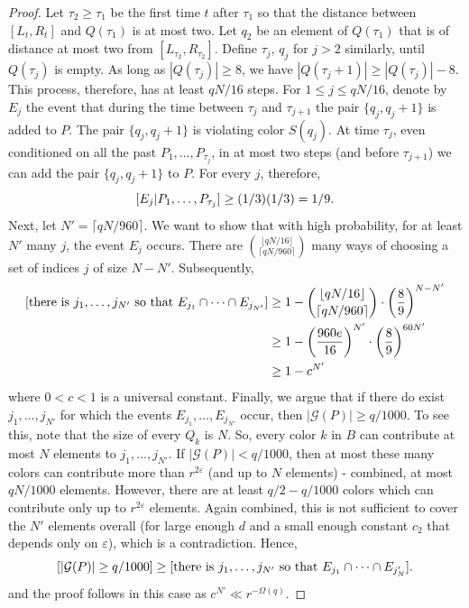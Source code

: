 \documentclass[10pt,a4paper]{article}
\theoremstyle{definition}%
\theoremstyle{plain}
\let\Pr\relax
\DeclareMathOperator*{\Pr}{\mathbb{P}}
\newcommand{\eps}{\varepsilon}
\renewcommand{\epsilon}{\eps}
\newcommand{\calG}{\mathcal{G}}
\begin{document}
\begin{proof}
Let $\tau_2 \geq \tau_1$ be the first time $t$ after $\tau_1$ so that the distance between $[L_t
, R_t
]$ and $Q(\tau_1)$ is at most
two. Let $q_2$ be an element of $Q(\tau_1)$ that is of distance at most two from $[L_{\tau_2}
, R_{\tau_2}
]$.
Define $\tau_j$, $q_j$ for $j > 2$ similarly, until $Q(\tau_j )$ is empty. As long as $|Q(\tau_j )| \geq 8$, we have $|Q(\tau_j+1)| \geq
|Q(\tau_j )| - 8$. This process, therefore, has at least $qN/16$ steps.
For $1 \leq j \leq qN/16$, denote by $E_j$ the event that during the time between $\tau_j$ and $\tau_{j+1}$ the pair
$\{q_j , q_j + 1\}$ is added to $P$. The pair $\{q_j , q_j + 1\}$ is violating color $S(q_j)$. At time $\tau_j$, even conditioned
on all the past $P_1, \ldots , P_{\tau_j}$, in at most two steps (and before $\tau_{j+1}$) we can add the pair $\{q_j , q_j + 1\}$
to $P$. For every $j$, therefore,
\[
\Pr[E_j |P_1,\ldots , P_{\tau_j}] \geq (1/3)(1/3) = 1/9.
\]
Next, let $N' = \lceil qN/960\rceil$. We want to show that with high probability,  for at least $N'$ many $j$, the event $E_j$ occurs. There are $\binom{\lfloor qN/16\rfloor}{\lceil qN/960 \rceil}$ many ways of choosing a set of indices $j$ of size $N-N'$. Subsequently,
\begin{align*}
\Pr[\text{there is $j_1,\ldots , j_{N'}$ so that $E_{j_1}\cap \cdots \cap E_{j_{N'}}$}] &\geq  1 - \binom{\lfloor qN/16\rfloor}{\lceil qN/960 \rceil}\cdot \left(\frac{8}{9}\right)^{N-N'}\\
&\geq 1 - \left(\frac{960e}{16}\right)^{N'}\cdot \left(\frac{8}{9}\right)^{60N'}\\
&\geq 1 - c^{N'}
\end{align*}
where $0< c < 1$ is a universal constant. Finally, we argue that if there do exist $j_1,\ldots , j_{N'}$ for which the events $E_{j_1},\ldots, E_{j_{N'}}$ occur, then $|\calG(P)|\geq q/1000$. To see this, note that the size of every $Q_k$ is $N$. So, every color $k$ in $B$ can contribute at most $N$ elements to
$j_1, \ldots , j_{N'}$. If $|\calG(P)|<q/1000$, then at most these many colors can contribute more than $r^{2\eps}$ (and up to $N$ elements) - combined, at most $qN/1000$ elements. However, there are at least $q/2 - q/1000$ colors which can contribute only up to $r^{2\eps}$ elements. Again combined, this is not sufficient to cover the $N'$ elements overall (for large enough $d$ and a small enough constant $c_2$ that depends only on $\epsilon$), which is a contradiction. Hence,
\[
\Pr[|\calG(P)| \geq q/1000] \geq \Pr[\text{there is $j_1,\ldots , j_{N'}$ so that $E_{j_1}\cap \cdots \cap E_{j_N'}$}].
\]
and the proof follows in this case as $c^{N'}\ll r^{-\Omega(q)}$.


\end{proof}
\end{document}

